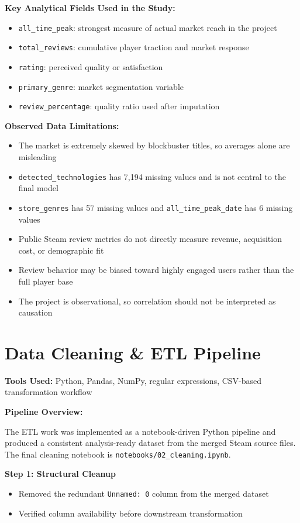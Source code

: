 \documentclass[12pt,a4paper]{report}
\begin{document}
\textbf{Key Analytical Fields Used in the Study:}
\begin{itemize}
\item \texttt{all\_time\_peak}: strongest measure of actual market reach in the project
\item \texttt{total\_reviews}: cumulative player traction and market response
\item \texttt{rating}: perceived quality or satisfaction
\item \texttt{primary\_genre}: market segmentation variable
\item \texttt{review\_percentage}: quality ratio used after imputation
\end{itemize}

\textbf{Observed Data Limitations:}
\begin{itemize}
\item The market is extremely skewed by blockbuster titles, so averages alone are misleading
\item \texttt{detected\_technologies} has 7,194 missing values and is not central to the final model
\item \texttt{store\_genres} has 57 missing values and \texttt{all\_time\_peak\_date} has 6 missing values
\item Public Steam review metrics do not directly measure revenue, acquisition cost, or demographic fit
\item Review behavior may be biased toward highly engaged users rather than the full player base
\item The project is observational, so correlation should not be interpreted as causation
\end{itemize}

\chapter{Data Cleaning \& ETL Pipeline}

\textbf{Tools Used:} Python, Pandas, NumPy, regular expressions, CSV-based transformation workflow

\textbf{Pipeline Overview:}

The ETL work was implemented as a notebook-driven Python pipeline and produced a consistent analysis-ready dataset from the merged Steam source files. The final cleaning notebook is \texttt{notebooks/02\_cleaning.ipynb}.

\textbf{Step 1: Structural Cleanup}
\begin{itemize}
\item Removed the redundant \texttt{Unnamed: 0} column from the merged dataset
\item Verified column availability before downstream transformation
\end{itemize}
\end{document}
